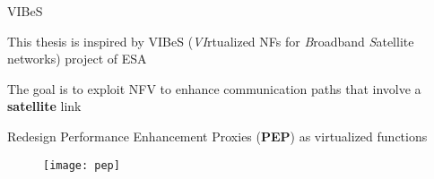 \begin{frame}{VIBeS}

  This thesis is inspired by VIBeS (\emph{VI}rtualized NFs for \emph{B}roadband
  \emph{S}atellite networks) project of ESA

  \vfill{}

  The goal is to exploit NFV to enhance communication paths that involve
  a \textbf{satellite} link

  \vfill{}

  Redesign Performance Enhancement Proxies (\textbf{PEP}) as virtualized
  functions

  \vfill{}

  \begin{figure}
    \centering
    \texttt{[image: pep]}
  \end{figure}

\end{frame}